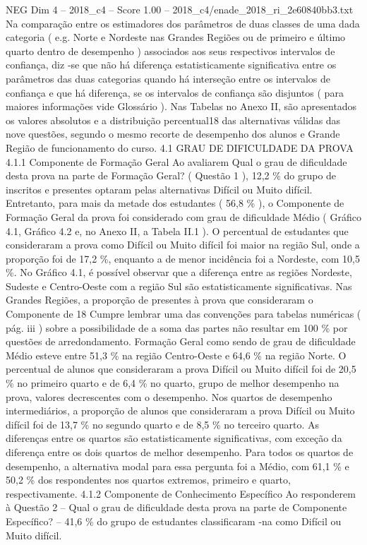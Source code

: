 \begin{textsample}{NEG Dim 4 – 2018\_c4 – Score 1.00 – 2018\_c4/enade\_2018\_ri\_2e60840bb3.txt}
Na comparação entre os estimadores dos parâmetros de duas classes de uma dada categoria ( e.g.
Norte e Nordeste nas Grandes Regiões ou de primeiro e último quarto dentro de desempenho ) associados aos seus respectivos intervalos de confiança, diz -se que não há diferença estatisticamente significativa entre os parâmetros das duas categorias quando há interseção entre os intervalos de confiança e que há diferença, se os intervalos de confiança são disjuntos ( para maiores informações vide Glossário ).
Nas Tabelas no Anexo II, são apresentados os valores absolutos e a distribuição percentual18 das alternativas válidas das nove questões, segundo o mesmo recorte de desempenho dos alunos e Grande Região de funcionamento do curso. 4.1 GRAU DE DIFICULDADE DA PROVA 4.1.1 Componente de Formação Geral Ao avaliarem Qual o grau de dificuldade desta prova na parte de Formação Geral? ( Questão 1 ), 12,2 \% do grupo de inscritos e presentes optaram pelas alternativas Difícil ou Muito difícil.
Entretanto, para mais da metade dos estudantes ( 56,8 \% ), o Componente de Formação Geral da prova foi considerado com grau de dificuldade Médio ( Gráfico 4.1, Gráfico 4.2 e, no Anexo II, a Tabela II.1 ).
O percentual de estudantes que consideraram a prova como Difícil ou Muito difícil foi maior na região Sul, onde a proporção foi de 17,2 \%, enquanto a de menor incidência foi a Nordeste, com 10,5 \%.
No Gráfico 4.1, é possível observar que a diferença entre as regiões Nordeste, Sudeste e Centro-Oeste com a região Sul são estatisticamente significativas.
Nas Grandes Regiões, a proporção de presentes à prova que consideraram o Componente de 18 Cumpre lembrar uma das convenções para tabelas numéricas ( pág. iii ) sobre a possibilidade de a soma das partes não resultar em 100 \% por questões de arredondamento.
Formação Geral como sendo de grau de dificuldade Médio esteve entre 51,3 \% na região Centro-Oeste e 64,6 \% na região Norte.
O percentual de alunos que consideraram a prova Difícil ou Muito difícil foi de 20,5 \% no primeiro quarto e de 6,4 \% no quarto, grupo de melhor desempenho na prova, valores decrescentes com o desempenho.
Nos quartos de desempenho intermediários, a proporção de alunos que consideraram a prova Difícil ou Muito difícil foi de 13,7 \% no segundo quarto e de 8,5 \% no terceiro quarto.
As diferenças entre os quartos são estatisticamente significativas, com exceção da diferença entre os dois quartos de melhor desempenho.
Para todos os quartos de desempenho, a alternativa modal para essa pergunta foi a Médio, com 61,1 \% e 50,2 \% dos respondentes nos quartos extremos, primeiro e quarto, respectivamente. 4.1.2 Componente de Conhecimento Específico Ao responderem à Questão 2 – Qual o grau de dificuldade desta prova na parte de Componente Específico? – 41,6 \% do grupo de estudantes classificaram -na como Difícil ou Muito difícil.

\end{textsample}

